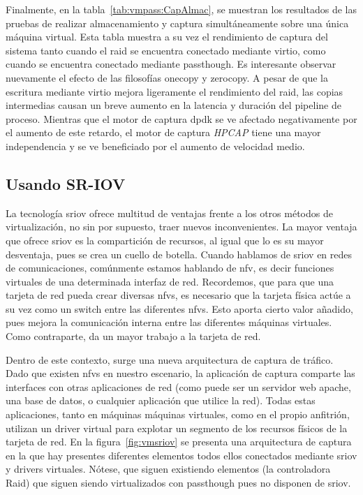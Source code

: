 Finalmente, en la tabla~\ref{tab:vmpass:CapAlmac}, se muestran los resultados de las pruebas de realizar almacenamiento y captura simultáneamente sobre una única máquina virtual. Esta tabla muestra a su vez el rendimiento de captura del sistema tanto cuando el raid se encuentra conectado mediante \gls{virtio}, como cuando se encuentra conectado mediante \gls{passthough}. Es interesante observar nuevamente el efecto de las filosofías \gls{onecopy} y \gls{zerocopy}. A pesar de que la escritura mediante \gls{virtio} mejora ligeramente el rendimiento del raid, las copias intermedias causan un breve aumento en la latencia y duración del pipeline de proceso. Mientras que el motor de captura \gls{dpdk} se ve afectado negativamente por el aumento de este retardo, el motor de captura \textit{HPCAP} tiene una mayor independencia y se ve beneficiado por el aumento de velocidad medio.


\subsection{Usando SR-IOV\label{sec:sriov}}

La tecnología \gls{sriov} ofrece multitud de ventajas frente a los otros métodos de virtualización, no sin por supuesto, traer nuevos inconvenientes. La mayor ventaja que ofrece \gls{sriov} es la compartición de recursos, al igual que lo es su mayor desventaja, pues se crea un cuello de botella. Cuando hablamos de \gls{sriov} en redes de comunicaciones, comúnmente estamos hablando de \gls{nfv}, es decir funciones virtuales de una determinada interfaz de red. Recordemos, que para que una tarjeta de red pueda crear diversas \glspl{nfv}, es necesario que la tarjeta física actúe a su vez como un switch entre las diferentes \glspl{nfv}. Esto aporta cierto valor añadido, pues mejora la comunicación interna entre las diferentes máquinas virtuales. Como contraparte, da un mayor trabajo a la tarjeta de red.

Dentro de este contexto, surge una nueva arquitectura de captura de tráfico. Dado que existen \glspl{nfv} en nuestro escenario, la aplicación de captura comparte las interfaces con otras aplicaciones de red (como puede ser un servidor web apache, una base de datos, o cualquier aplicación que utilice la red). Todas estas aplicaciones, tanto en máquinas máquinas virtuales, como en el propio anfitrión, utilizan un driver virtual para explotar un segmento de los recursos físicos de la tarjeta de red.
En la figura~\ref{fig:vmsriov} se presenta una arquitectura de captura en la que hay presentes diferentes elementos todos ellos conectados mediante \gls{sriov} y drivers virtuales. Nótese, que siguen existiendo elementos (la controladora Raid) que siguen siendo virtualizados con \gls{passthough} pues no disponen de \gls{sriov}.

